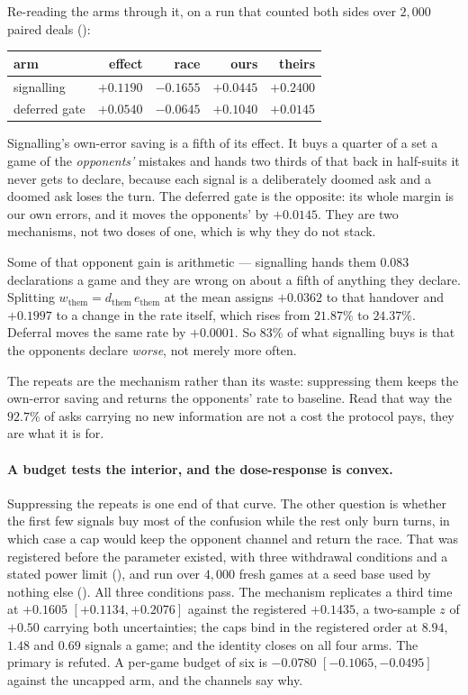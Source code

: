 \documentclass[11pt,letterpaper]{article}
\begin{document}
Re-reading the arms through it, on a run that counted both sides over $2{,}000$
paired deals ():

\begin{center}
\small
\begin{tabular}{lrrrr}
\toprule
arm & effect & race & ours & theirs \\
\midrule
signalling & $+0.1190$ & $-0.1655$ & $+0.0445$ & $\mathbf{+0.2400}$ \\
deferred gate & $+0.0540$ & $-0.0645$ & $\mathbf{+0.1040}$ & $+0.0145$ \\
\bottomrule
\end{tabular}
\end{center}

\noindent Signalling's own-error saving is a fifth of its effect. It buys a
quarter of a set a game of the \emph{opponents'} mistakes and hands two thirds
of that back in half-suits it never gets to declare, because each signal is a
deliberately doomed ask and a doomed ask loses the turn. The deferred gate is
the opposite: its whole margin is our own errors, and it moves the opponents'
by $+0.0145$. They are two mechanisms, not two doses of one, which is why they
do not stack.

Some of that opponent gain is arithmetic --- signalling hands them $0.083$
declarations a game and they are wrong on about a fifth of anything they
declare. Splitting $w_{\text{them}} = d_{\text{them}} \, e_{\text{them}}$ at
the mean assigns $+0.0362$ to that handover and $\mathbf{+0.1997}$ to a change
in the rate itself, which rises from $21.87\%$ to $24.37\%$. Deferral moves the
same rate by $+0.0001$. So $83\%$ of what signalling buys is that the opponents
declare \emph{worse}, not merely more often.

The repeats are the mechanism rather than its waste: suppressing them keeps the
own-error saving and returns the opponents' rate to baseline. Read that way the
$92.7\%$ of asks carrying no new information are not a cost the protocol pays,
they are what it is for.

\paragraph{A budget tests the interior, and the dose-response is convex.}
Suppressing the repeats is one end of that curve. The other question is whether
the first few signals buy most of the confusion while the rest only burn turns,
in which case a cap would keep the opponent channel and return the race. That
was registered before the parameter existed, with three withdrawal conditions
and a stated power limit (), and run over
$4{,}000$ fresh games at a seed base used by nothing else
(). All three conditions pass. The
mechanism replicates a third time at $+0.1605$ $[+0.1134, +0.2076]$ against the
registered $+0.1435$, a two-sample $z$ of $+0.50$ carrying both uncertainties;
the caps bind in the registered order at $8.94$, $1.48$ and $0.69$ signals a
game; and the identity closes on all four arms. The primary is refuted. A
per-game budget of six is $-0.0780$ $[-0.1065, -0.0495]$ against the uncapped
arm, and the channels say why.
\end{document}
